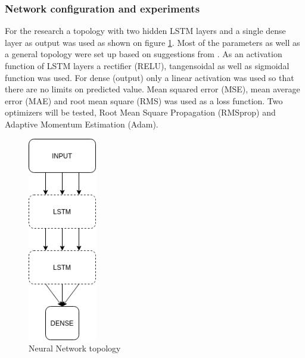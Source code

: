 \subsubsection{Network configuration and experiments}
For the research a topology with two hidden LSTM layers and a single dense layer as output was 
used as shown on figure \ref{fig:topology}.
Most of the parameters as well as a general topology were set up based on suggestions from 
\cite{Chollet2018}. As an activation function of LSTM layers a rectifier (RELU),
tangensoidal as well as sigmoidal function was used.
For dense (output) only a linear activation was used so that there are no limits on predicted 
value.
Mean squared error (MSE), mean average error (MAE) and root mean square (RMS)
was used as a loss function.
Two optimizers will be tested, Root Mean Square Propagation (RMSprop)\cite{Hinton2012} and 
Adaptive Momentum Estimation (Adam)\cite{Kingma2015}.
\begin{figure}[ht] 
	\centering
	\includegraphics[width=3cm]{res/topology}
	\caption{Neural Network topology}
	\label{fig:topology}
\end{figure}

